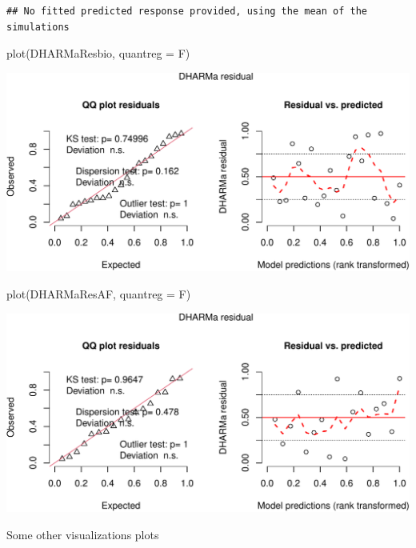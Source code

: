 \documentclass[
]{book}
\newenvironment{Shaded}{\begin{snugshade}}{\end{snugshade}}
\newcommand{\AttributeTok}[1]{\textcolor[rgb]{0.77,0.63,0.00}{#1}}
\newcommand{\FunctionTok}[1]{\textcolor[rgb]{0.00,0.00,0.00}{#1}}
\newcommand{\NormalTok}[1]{#1}
\begin{document}
\begin{verbatim}
## No fitted predicted response provided, using the mean of the simulations
\end{verbatim}

\begin{Shaded}
\begin{Highlighting}[]
\FunctionTok{plot}\NormalTok{(DHARMaResbio, }\AttributeTok{quantreg =}\NormalTok{ F)}
\end{Highlighting}
\end{Shaded}

\includegraphics{_main_files/figure-latex/ppp_no_param_var-1.pdf}

\begin{Shaded}
\begin{Highlighting}[]
\FunctionTok{plot}\NormalTok{(DHARMaResAF, }\AttributeTok{quantreg =}\NormalTok{ F)}
\end{Highlighting}
\end{Shaded}

\includegraphics{_main_files/figure-latex/ppp_no_param_var-2.pdf}

Some other visualizations plots
\end{document}
